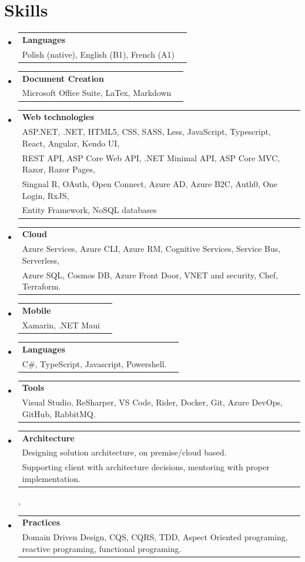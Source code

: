 \documentclass[A4,11pt]{article}
\makeatletter
\newcommand{\CVSubheading}[4]{
  \vspace{-2pt}\item
    \begin{tabular*}{0.97\textwidth}[t]{l@{\extracolsep{\fill}}r}
      \textbf{#1} & #2 \\
      \small#3 & \small #4 \\
    \end{tabular*}\vspace{-7pt}
}
\newcommand{\CVSubHeadingListStart}{\begin{itemize}[leftmargin=0.5cm, label={}]}
\newcommand{\CVSubHeadingListEnd}{\end{itemize}}
\makeatother
\begin{document}
\section{Skills}
  \CVSubHeadingListStart
    \CVSubheading
      {Languages}{}
      {Polish (native), English (B1), French (A1)}{}
    \CVSubheading
      {Document Creation}{}
      {Microsoft Office Suite, LaTex, Markdown}{}
    \CVSubheading
      {Web technologies}{}
      {ASP.NET, .NET, HTML5, CSS, SASS, Less, JavaScript, Typescript, React, Angular, Kendo UI, \\
      REST API, ASP Core Web API, .NET Minimal API, ASP Core MVC, Razor, Razor Pages,\\
      Singnal R, OAuth, Open Connect, Azure AD, Azure B2C, Auth0, One Login, RxJS,\\
      Entity Framework, NoSQL databases}{}
    \CVSubheading
      {Cloud}{}
      {Azure Services, Azure CLI, Azure RM, Cognitive Services, Service Bus, Serverless,\\
      Azure SQL, Cosmos DB, Azure Front Door, VNET and security, Chef, Terraform.}{}
    \CVSubheading
      {Mobile}{}
      {Xamarin, .NET Maui}{}
    \CVSubheading
      {Languages}{}
      {C\#, TypeScript, Javascript, Powershell.}{}
    \CVSubheading
      {Tools}{}
      {Visual Studio, ReSharper, VS Code, Rider, Docker, Git, Azure DevOps, GitHub, RabbitMQ.}{}
    \CVSubheading
      {Architecture}{}
      {Designing solution architecture, on premise/cloud based.\\
      Supporting client with architecture decisions, mentoring with proper implementation.}{},
    \CVSubheading
      {Practices}{}
      {Domain Driven Design, CQS, CQRS, TDD, Aspect Oriented programing, reactive programing, functional programing.}{}
  \CVSubHeadingListEnd  
    
\end{document}
